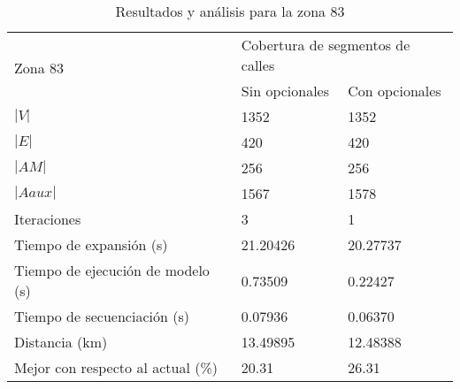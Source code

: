 \begin{table}[htbp]
\caption{Resultados y análisis para la zona 83}
\begin{tabular}{lll}
\hline
\multirow{2}{*}{Zona 83}                            & \multicolumn{2}{l}{Cobertura de segmentos de calles} \\ \cline{2-3} 
                                                    & Sin opcionales           & Con opcionales           \\ \hline
$|V|$                                                   & 1352                     & 1352                     \\
$|E|$                                                   & 420                      & 420                      \\
$|AM|$                                                  & 256                      & 256                      \\
$|Aaux|$                                                & 1567                     & 1578                     \\
Iteraciones                                         & 3                        & 1                        \\
Tiempo de expansión (s)                      & 21.20426                 & 20.27737                 \\ 
Tiempo de ejecución de modelo (s)            & 0.73509                  & 0.22427                  \\ 
Tiempo de secuenciación (s)                  & 0.07936                  & 0.06370                  \\ 
Distancia (km)                                      & 13.49895                 & 12.48388                 \\ 
Mejor con respecto al actual (\%) & 20.31                    & 26.31                    \\ \hline
\end{tabular}
\label{table:comparacionZona83}
\end{table}

